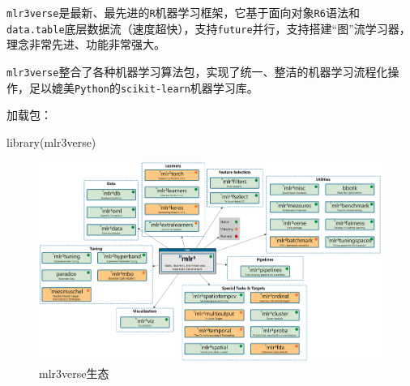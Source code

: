 \documentclass[
  11pt,
  ignorenonframetext,
  dvipsnames,UTF8]{beamer}
\newenvironment{Shaded}{\begin{snugshade}}{\end{snugshade}}
\newcommand{\FunctionTok}[1]{\textcolor[rgb]{0.00,0.00,0.00}{#1}}
\newcommand{\NormalTok}[1]{#1}
\begin{document}
\begin{frame}[fragile]{}
\protect\hypertarget{section}{}
\texttt{mlr3verse}是最新、最先进的\texttt{R}机器学习框架，它基于面向对象\texttt{R6}语法和
\texttt{data.table}底层数据流（速度超快），支持\texttt{future}并行，支持搭建``图''流学习器，理念非常先进、功能非常强大。

\texttt{mlr3verse}整合了各种机器学习算法包，实现了统一、整洁的机器学习流程化操作，足以媲美\texttt{Python}的\texttt{scikit-learn}机器学习库。

加载包：

\begin{Shaded}
\begin{Highlighting}[]
\FunctionTok{library}\NormalTok{(mlr3verse) }
\end{Highlighting}
\end{Shaded}
\end{frame}

\begin{frame}{}
\protect\hypertarget{section-1}{}
\begin{figure}

{\centering \includegraphics[width=1\linewidth]{images/mlr3_eco} 

}

\caption{mlr3verse生态}\label{fig:unnamed-chunk-5}
\end{figure}
\end{frame}
\end{document}
